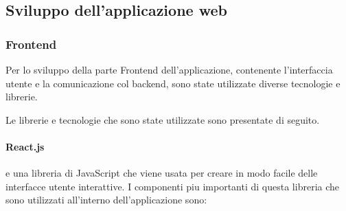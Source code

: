\documentclass[a4paper,12pt]{report}
\begin{document}
		\subsection{Sviluppo dell'applicazione web}

			\subsubsection{Frontend}
			Per lo sviluppo della parte Frontend dell'applicazione, contenente l'interfaccia utente e la comunicazione col backend, sono state utilizzate diverse tecnologie e librerie. \par
			Le librerie e tecnologie che sono state utilizzate sono presentate di seguito.

			\paragraph*{React.js} \par e una libreria di JavaScript che viene usata per creare in modo facile delle interfacce utente interattive. 
				I componenti piu importanti di questa libreria che sono utilizzati all'interno dell'applicazione sono:
\end{document}
